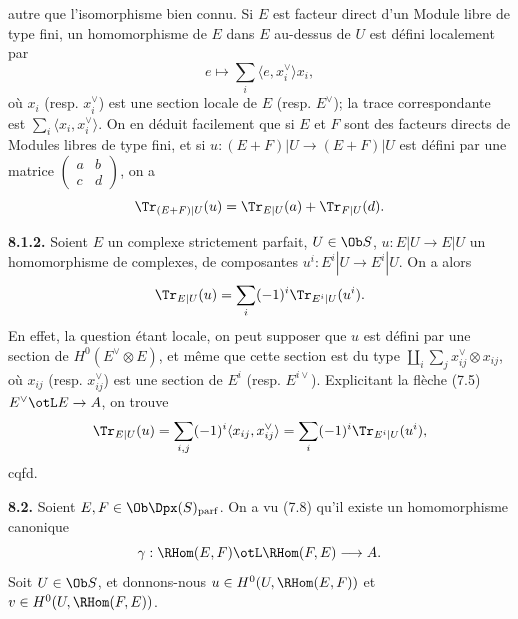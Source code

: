 autre que l'isomorphisme bien connu. Si \(E\) est facteur direct d'un Module libre de type fini, un homomorphisme de \(E\) dans \(E\) au-dessus de \(U\) est défini localement par
\[
  e\longmapsto \sum_i\langle e,x_i^\vee\rangle x_i,
\]
où \(x_i\) (resp. \(x_i^\vee\)) est une section locale de \(E\) (resp. \(E^\vee\)); la trace correspondante est \(\sum_i\langle x_i,x_i^\vee\rangle\). On en déduit facilement que si \(E\) et \(F\) sont des facteurs directs de Modules libres de type fini, et si \(u:(E+F)|U\longrightarrow(E+F)|U\) est défini par une matrice \(\begin{pmatrix}a&b\\ c&d\end{pmatrix}\), on a
\[
  \Tr_{(E+F)|U}(u)=\Tr_{E|U}(a)+\Tr_{F|U}(d).
\]

\textbf{8.1.2.} Soient \(E\) un complexe strictement parfait, \(U\in\Ob S\), \(u:E|U\longrightarrow E|U\) un homomorphisme de complexes, de composantes \(u^i:E^i|U\to E^i|U\). On a alors
\[
  \Tr_{E|U}(u)=\sum_i(-1)^i\Tr_{E^i|U}(u^i).
\]
En effet, la question étant locale, on peut supposer que \(u\) est défini par une section de \(H^0(E^\vee\otimes E)\), et même que cette section est du type \(\coprod_i\sum_j x_{ij}^\vee\otimes x_{ij}\), où \(x_{ij}\) (resp. \(x_{ij}^\vee\)) est une section de \(E^i\) (resp. \(E^{i\vee}\)). Explicitant la flèche (7.5) \(E^\vee\otL E\to A\), on trouve
\[
  \Tr_{E|U}(u)=\sum_{i,j}(-1)^i\langle x_{ij},x_{ij}^\vee\rangle
  =\sum_i(-1)^i\Tr_{E^i|U}(u^i),
\]
cqfd.

\textbf{8.2.} Soient \(E,F\in\Ob\Dpx(S)_{\mathrm{parf}}\). On a vu (7.8) qu'il existe un homomorphisme canonique
\[
  \gamma:\RHom(E,F)\otL\RHom(F,E)\longrightarrow A.
\]
Soit \(U\in\Ob S\), et donnons-nous \(u\in H^0(U,\RHom(E,F))\) et \(v\in H^0(U,\RHom(F,E))\).
